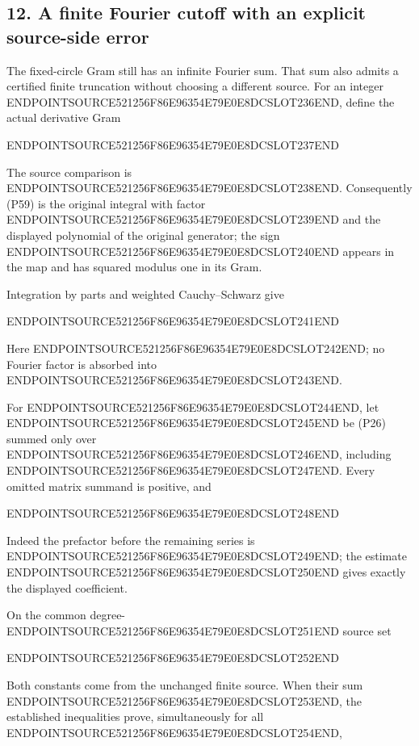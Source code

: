 \subsection{12. A finite Fourier cutoff with an explicit source-side error}\label{endpoint-periodized_original--a-finite-fourier-cutoff-with-an-explicit-source-side-error}

The fixed-circle Gram still has an infinite Fourier sum. That sum also admits a certified finite truncation without choosing a different source. For an integer ENDPOINTSOURCE521256F86E96354E79E0E8DCSLOT236END, define the actual derivative Gram

ENDPOINTSOURCE521256F86E96354E79E0E8DCSLOT237END

The source comparison is ENDPOINTSOURCE521256F86E96354E79E0E8DCSLOT238END. Consequently (P59) is the original integral with factor ENDPOINTSOURCE521256F86E96354E79E0E8DCSLOT239END and the displayed polynomial of the original generator; the sign ENDPOINTSOURCE521256F86E96354E79E0E8DCSLOT240END appears in the map and has squared modulus one in its Gram.

Integration by parts and weighted Cauchy--Schwarz give

ENDPOINTSOURCE521256F86E96354E79E0E8DCSLOT241END

Here ENDPOINTSOURCE521256F86E96354E79E0E8DCSLOT242END; no Fourier factor is absorbed into ENDPOINTSOURCE521256F86E96354E79E0E8DCSLOT243END.

For ENDPOINTSOURCE521256F86E96354E79E0E8DCSLOT244END, let ENDPOINTSOURCE521256F86E96354E79E0E8DCSLOT245END be (P26) summed only over ENDPOINTSOURCE521256F86E96354E79E0E8DCSLOT246END, including ENDPOINTSOURCE521256F86E96354E79E0E8DCSLOT247END. Every omitted matrix summand is positive, and

ENDPOINTSOURCE521256F86E96354E79E0E8DCSLOT248END

Indeed the prefactor before the remaining series is ENDPOINTSOURCE521256F86E96354E79E0E8DCSLOT249END; the estimate ENDPOINTSOURCE521256F86E96354E79E0E8DCSLOT250END gives exactly the displayed coefficient.

On the common degree-ENDPOINTSOURCE521256F86E96354E79E0E8DCSLOT251END source set

ENDPOINTSOURCE521256F86E96354E79E0E8DCSLOT252END

Both constants come from the unchanged finite source. When their sum ENDPOINTSOURCE521256F86E96354E79E0E8DCSLOT253END, the established inequalities prove, simultaneously for all ENDPOINTSOURCE521256F86E96354E79E0E8DCSLOT254END,

